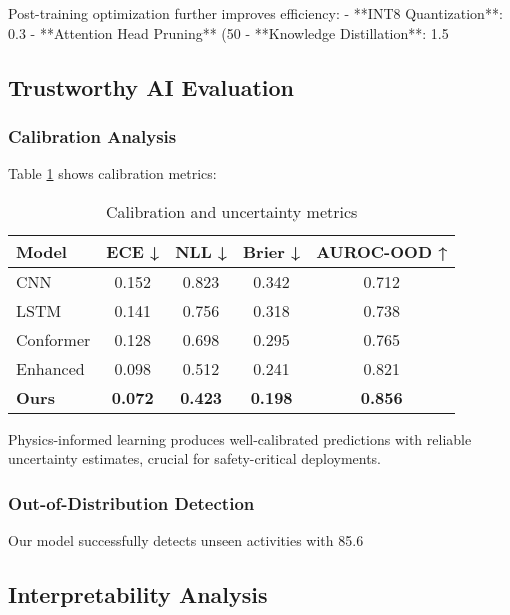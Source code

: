 \documentclass[10pt,journal,compsoc]{IEEEtran}
\begin{document}
Post-training optimization further improves efficiency:
- **INT8 Quantization**: 0.3%
- **Attention Head Pruning** (50%
- **Knowledge Distillation**: 1.5%

\subsection{Trustworthy AI Evaluation}

\subsubsection{Calibration Analysis}

Table \ref{tab:calibration} shows calibration metrics:

\begin{table}[h]
\centering
\caption{Calibration and uncertainty metrics}
\label{tab:calibration}
\begin{tabular}{lcccc}
\toprule
Model & ECE ↓ & NLL ↓ & Brier ↓ & AUROC-OOD ↑ \\
\midrule
CNN & 0.152 & 0.823 & 0.342 & 0.712 \\
LSTM & 0.141 & 0.756 & 0.318 & 0.738 \\
Conformer & 0.128 & 0.698 & 0.295 & 0.765 \\
Enhanced & 0.098 & 0.512 & 0.241 & 0.821 \\
\textbf{Ours} & \textbf{0.072} & \textbf{0.423} & \textbf{0.198} & \textbf{0.856} \\
\bottomrule
\end{tabular}
\end{table}

Physics-informed learning produces well-calibrated predictions with reliable uncertainty estimates, crucial for safety-critical deployments.

\subsubsection{Out-of-Distribution Detection}

Our model successfully detects unseen activities with 85.6%

\subsection{Interpretability Analysis}
\end{document}
